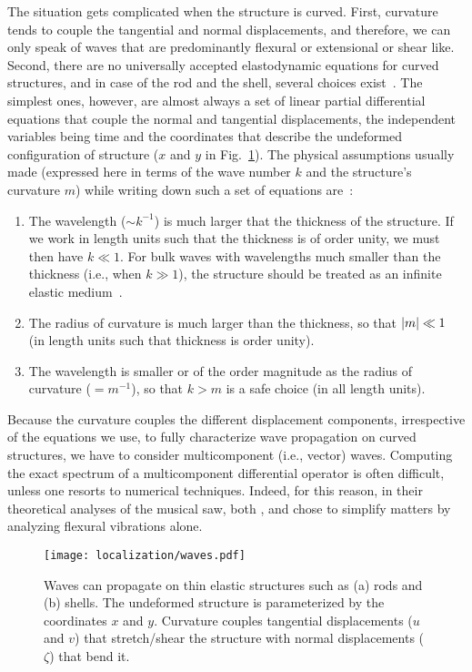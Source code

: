 The situation gets complicated when the structure is curved.
First, curvature tends to couple the tangential and normal displacements, and therefore, we can only speak of waves that are predominantly flexural or extensional or shear like.
Second, there are no universally accepted elastodynamic equations for curved structures, and in case of the rod and the shell, several choices exist~\cite{morley1961,pierce1993,doyle2021,kernes2021}.
The simplest ones, however, are almost always a set of linear partial differential equations that couple the normal and tangential displacements, the independent variables being time and the coordinates that describe the undeformed configuration of structure ($x$ and $y$ in Fig.~\ref{fig:waves}).
The physical assumptions usually made (expressed here in terms of the wave number $k$ and the structure's curvature $m$) while writing down such a set of equations are~\cite{pierce1993,norris1994,kernes2021}:
%
\begin{enumerate}
  \item The wavelength ($\sim k^{-1}$) is much larger that the thickness of the structure.
    If we work in length units such that the thickness is of order unity, we must then have $k \ll 1$.
    For bulk waves with wavelengths much smaller than the thickness (i.e., when $k \gg 1$), the structure should be treated as an infinite elastic medium~\cite{landau1986}.
  \item The radius of curvature is much larger than the thickness, so that $\lvert m\rvert \ll 1$ (in length units such that thickness is order unity).
  \item The wavelength is smaller or of the order magnitude as the radius of curvature ($= m^{-1}$), so that $k > m$ is a safe choice (in all length units).
\end{enumerate}

Because the curvature couples the different displacement components, irrespective of the equations we use, to fully characterize wave propagation on curved structures, we have to consider multicomponent (i.e., vector) waves.
Computing the exact spectrum of a multicomponent differential operator is often difficult, unless one resorts to numerical techniques.
Indeed, for this reason, in their theoretical analyses of the musical saw, both \citet{scott1992}, and \citet{shankar2022} chose to simplify matters by analyzing flexural vibrations alone.
%
\begin{figure}
  \begin{center}
    \texttt{[image: localization/waves.pdf]}
  \end{center}
  \caption{
    Waves can propagate on thin elastic structures such as (a) rods and (b) shells.
    The undeformed structure is parameterized by the coordinates $x$ and $y$.
    Curvature couples tangential displacements ($u$ and $v$) that stretch/shear the structure with normal displacements ($\zeta$) that bend it.
  }
  \label{fig:waves}
\end{figure}

